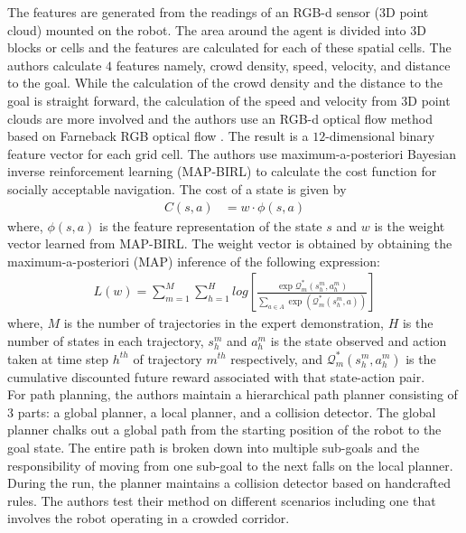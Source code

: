 The features are generated from the readings of an RGB-d sensor (3D point cloud) mounted on the robot. The area around the agent is divided into 3D blocks or cells and the features are calculated for each of these spatial cells. 
The authors calculate $4$ features namely,
crowd density, speed, velocity, and distance to the goal.
While the calculation of the crowd density and the distance to the goal is straight forward, the calculation of the speed and velocity from 3D point clouds are more involved and the authors use an RGB-d optical flow method based on Farneback RGB optical flow \cite{farneback_optical_flow}. 
The result is a $12$-dimensional binary feature vector for each grid cell.
The authors use maximum-a-posteriori Bayesian inverse reinforcement learning (MAP-BIRL) \cite{choi_MAP-BIRL_2011} to calculate the cost function for socially acceptable navigation. The cost of a state is given by
\begin{align}
C(s,a) &=w \cdot \phi(s,a)
\end{align}
where, $\phi(s,a)$ is the feature representation of the state $s$ and $w$ is the weight vector learned from MAP-BIRL. 
The weight vector is obtained by obtaining the maximum-a-posteriori (MAP) inference of the following expression:
\begin{align}
L(w) = \sum^M_{m=1} \sum^{H}_{h=1}log[\frac{\exp \mathcal{Q}^{*}_m(s^m_h, a^m_h)}{\sum_{a\in A} \exp(\mathcal{Q}_m^*(s_h^m,a))}]
\end{align}
where, $M$ is the number of trajectories in the expert demonstration, $H$ is the number of states in each trajectory, $s_{h}^{m}$ and  $a_{h}^{m}$ is the state observed and action taken at time step $h^{th}$ of trajectory $m^{th}$ respectively, and $\mathcal{Q}^{*}_m(s^m_h, a^m_h)$ is the cumulative discounted future reward associated with that state-action pair.\\ 
For path planning, the authors maintain a hierarchical path planner consisting of 3 parts: a global planner, a local planner, and a collision detector.
The global planner chalks out a global path from the starting position of the robot to the goal state. The entire path is broken down into multiple sub-goals and the responsibility of moving from one sub-goal to the next falls on the local planner. During the run, the planner maintains a collision detector based on handcrafted rules.
The authors test their method on different scenarios including one that involves the robot operating in a crowded corridor.\\

